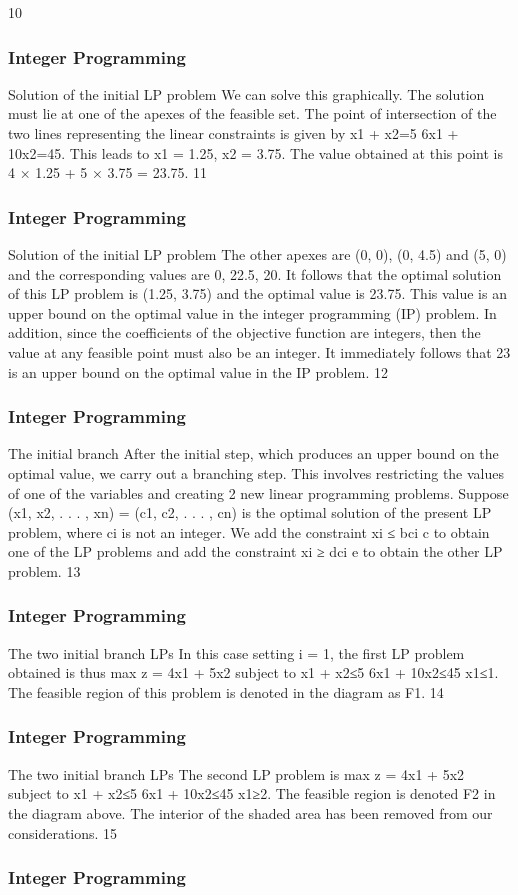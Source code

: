\begin{frame}
10 \end{frame}  \begin{frame} \frametitle{Integer Programming}     
Solution of the initial LP problem
We can solve this graphically. The solution must lie at one of the
apexes of the feasible set.
The point of intersection of the two lines representing the linear
constraints is given by
x1 + x2=5
6x1 + 10x2=45.
This leads to x1 = 1.25, x2 = 3.75. The value obtained at this
point is 4 × 1.25 + 5 × 3.75 = 23.75.
11 \end{frame}  \begin{frame} \frametitle{Integer Programming}     
Solution of the initial LP problem
The other apexes are (0, 0), (0, 4.5) and (5, 0) and the
corresponding values are 0, 22.5, 20.
It follows that the optimal solution of this LP problem is (1.25,
3.75) and the optimal value is 23.75. This value is an upper bound
on the optimal value in the integer programming (IP) problem.
In addition, since the coefficients of the objective function are
integers, then the value at any feasible point must also be an
integer. It immediately follows that 23 is an upper bound on the
optimal value in the IP problem.
12 \end{frame}  \begin{frame} \frametitle{Integer Programming}     
The initial branch
After the initial step, which produces an upper bound on the
optimal value, we carry out a branching step.
This involves restricting the values of one of the variables and
creating 2 new linear programming problems.
Suppose (x1, x2, . . . , xn) = (c1, c2, . . . , cn) is the optimal solution
of the present LP problem, where ci
is not an integer.
We add the constraint xi ≤ bci c to obtain one of the LP problems
and add the constraint xi ≥ dci e to obtain the other LP problem.
13 \end{frame}  \begin{frame} \frametitle{Integer Programming}     
The two initial branch LPs
In this case setting i = 1, the first LP problem obtained is thus
max z = 4x1 + 5x2
subject to
x1 + x2≤5
6x1 + 10x2≤45
x1≤1.
The feasible region of this problem is denoted in the diagram as F1.
14 \end{frame}  \begin{frame} \frametitle{Integer Programming}     
The two initial branch LPs
The second LP problem is
max z = 4x1 + 5x2
subject to
x1 + x2≤5
6x1 + 10x2≤45
x1≥2.
The feasible region is denoted F2 in the diagram above.
The interior of the shaded area has been removed from our
considerations.
15 \end{frame}  \begin{frame} \frametitle{Integer Programming}     

\end{frame}
